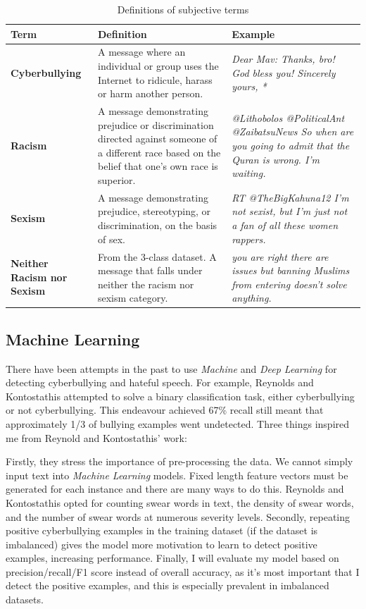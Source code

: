 \documentclass[12pt,a4paper]{article}
\begin{document}
\begin{table}[htb]
	\centering
	\caption{Definitions of subjective terms}
	\label{terms}
	\hspace*{-1.5cm}
	\begin{tabular}{p{2.8cm} p{8.0cm} p{7cm}} \hline\hline
		\textbf{Term} & \textbf{Definition} & \textbf{Example}  \\ \hline
		\textbf{Cyberbullying} & A message where an individual or group uses the Internet to ridicule, harass or harm another person. &  \textit{Dear Mav: Thanks, bro! God bless you!  Sincerely yours, *} \\ \hline
		\textbf{Racism} & A message demonstrating prejudice or discrimination directed against someone of a different race based on the belief that one's own race is superior. & \textit{@Lithobolos @PoliticalAnt @ZaibatsuNews So when are you going to admit that the Quran is wrong.  I'm waiting.} \\ \hline
		\textbf{Sexism} & A message demonstrating prejudice, stereotyping, or discrimination, on the basis of sex. & \textit{RT @TheBigKahuna12 I'm not sexist, but I'm just not a fan of all these women rappers.} \\ \hline
		\textbf{Neither Racism nor Sexism} & From the 3-class dataset. A message that falls under neither the racism nor sexism category. & \textit{you are right there are issues but banning Muslims from entering doesn’t solve anything.}\\ \hline
		
	\end{tabular}
\end{table}

\subsection{Machine Learning}
There have been attempts in the past to use \textit{Machine} and \textit{Deep Learning} for detecting cyberbullying and hateful speech. For example, Reynolds and Kontostathis \citeyear[p.4]{Reynolds} attempted to solve a binary classification task, either cyberbullying or not cyberbullying. This endeavour achieved 67\% recall still meant that approximately 1/3 of bullying examples went undetected. Three things inspired me from Reynold and Kontostathis' \citeyear{Reynolds} work:

Firstly, they stress the importance of pre-processing the data. We cannot simply input text into \textit{Machine Learning} models. Fixed length feature vectors must be generated for each instance and there are many ways to do this. Reynolds and Kontostathis opted for counting swear words in text, the density of swear words, and the number of swear words at numerous severity levels.  Secondly, repeating positive cyberbullying examples in the training dataset (if the dataset is imbalanced) gives the model more motivation to learn to detect positive examples, increasing performance. Finally, I will evaluate my model based on precision/recall/F1 score instead of overall accuracy, as it's most important that I detect the positive examples, and this is especially prevalent in imbalanced datasets.
\end{document}
